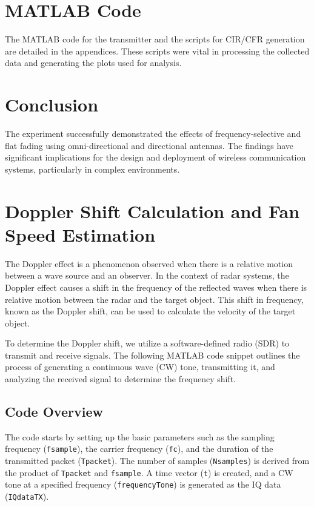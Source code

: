 \documentclass[12pt]{article}
\begin{document}
\section{MATLAB Code}
The MATLAB code for the transmitter and the scripts for CIR/CFR generation are detailed in the appendices. These scripts were vital in processing the collected data and generating the plots used for analysis.

\section{Conclusion}
The experiment successfully demonstrated the effects of frequency-selective and flat fading using omni-directional and directional antennas. The findings have significant implications for the design and deployment of wireless communication systems, particularly in complex environments.


\newpage
\section{Doppler Shift Calculation and Fan Speed Estimation}

The Doppler effect is a phenomenon observed when there is a relative motion between a wave source and an observer. In the context of radar systems, the Doppler effect causes a shift in the frequency of the reflected waves when there is relative motion between the radar and the target object. This shift in frequency, known as the Doppler shift, can be used to calculate the velocity of the target object.

To determine the Doppler shift, we utilize a software-defined radio (SDR) to transmit and receive signals. The following MATLAB code snippet outlines the process of generating a continuous wave (CW) tone, transmitting it, and analyzing the received signal to determine the frequency shift.

\subsection{Code Overview}

The code starts by setting up the basic parameters such as the sampling frequency (\texttt{fsample}), the carrier frequency (\texttt{fc}), and the duration of the transmitted packet (\texttt{Tpacket}). The number of samples (\texttt{Nsamples}) is derived from the product of \texttt{Tpacket} and \texttt{fsample}. A time vector (\texttt{t}) is created, and a CW tone at a specified frequency (\texttt{frequencyTone}) is generated as the IQ data (\texttt{IQdataTX}).
\end{document}

